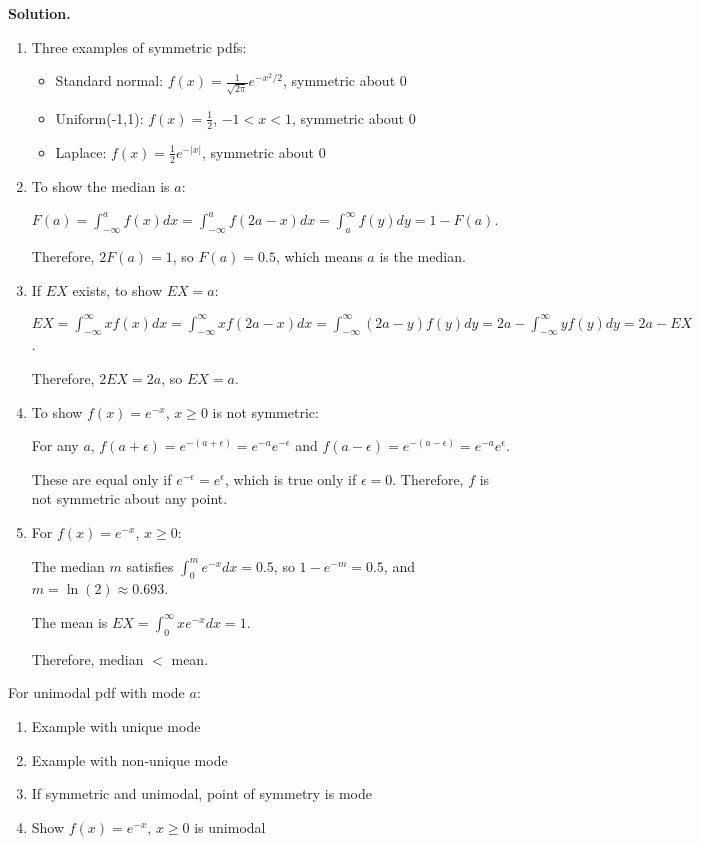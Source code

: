 \noindent\textbf{Solution.}
\begin{enumerate}[label=(\alph*)]
    \item Three examples of symmetric pdfs:
    \begin{itemize}
        \item Standard normal: $f(x) = \frac{1}{\sqrt{2\pi}}e^{-x^2/2}$, symmetric about 0
        \item Uniform(-1,1): $f(x) = \frac{1}{2}$, $-1 < x < 1$, symmetric about 0
        \item Laplace: $f(x) = \frac{1}{2}e^{-|x|}$, symmetric about 0
    \end{itemize}
    
    \item To show the median is $a$:
    
    $F(a) = \int_{-\infty}^a f(x)dx = \int_{-\infty}^a f(2a-x)dx = \int_a^{\infty} f(y)dy = 1 - F(a)$.
    
    Therefore, $2F(a) = 1$, so $F(a) = 0.5$, which means $a$ is the median.
    
    \item If $EX$ exists, to show $EX = a$:
    
    $EX = \int_{-\infty}^{\infty} x f(x)dx = \int_{-\infty}^{\infty} x f(2a-x)dx = \int_{-\infty}^{\infty} (2a-y) f(y)dy = 2a - \int_{-\infty}^{\infty} y f(y)dy = 2a - EX$.
    
    Therefore, $2EX = 2a$, so $EX = a$.
    
    \item To show $f(x)=e^{-x}$, $x\geq0$ is not symmetric:
    
    For any $a$, $f(a+\epsilon) = e^{-(a+\epsilon)} = e^{-a}e^{-\epsilon}$ and $f(a-\epsilon) = e^{-(a-\epsilon)} = e^{-a}e^{\epsilon}$.
    
    These are equal only if $e^{-\epsilon} = e^{\epsilon}$, which is true only if $\epsilon = 0$. Therefore, $f$ is not symmetric about any point.
    
    \item For $f(x)=e^{-x}$, $x\geq0$:
    
    The median $m$ satisfies $\int_0^m e^{-x}dx = 0.5$, so $1-e^{-m} = 0.5$, and $m = \ln(2) \approx 0.693$.
    
    The mean is $EX = \int_0^\infty xe^{-x}dx = 1$.
    
    Therefore, median $<$ mean.
\end{enumerate}

\begin{problembox}
For unimodal pdf with mode $a$:
\begin{enumerate}[label=(\alph*)]
    \item Example with unique mode
    \item Example with non-unique mode
    \item If symmetric and unimodal, point of symmetry is mode
    \item Show $f(x)=e^{-x}$, $x\geq0$ is unimodal
\end{enumerate}
\end{problembox}

